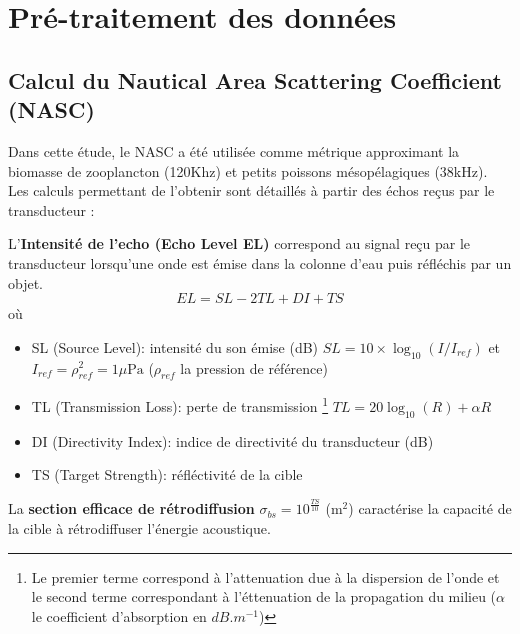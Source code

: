 \documentclass[11pt,a4paper,oneside]{report}
\begin{document}
	\section{Pré-traitement des données}
	\subsection{Calcul du Nautical Area Scattering Coefficient (NASC) \cite{IRD_MATECHO_User_Manual}}
	\label{section:compute_nasc}
	Dans cette étude, le NASC a été utilisée comme métrique approximant la biomasse de zooplancton (120Khz) et petits poissons mésopélagiques (38kHz). Les calculs permettant de l'obtenir sont détaillés à partir des échos reçus par le transducteur : 
	
	\vspace{0.5cm}
	
	L'\textbf{Intensité de l'echo (Echo Level EL) }correspond au signal reçu par le transducteur lorsqu'une onde est émise dans la colonne d'eau puis réfléchis par un objet.
	\begin{equation}
		EL = SL - 2TL + DI + TS
	\end{equation}	
	où 
	\begin{itemize}
		\item SL (Source Level): intensité du son émise (dB) $SL = 10 \times \log_{10}(I/I_{ref}) $ et $I_{ref} = \rho_{ref}^{2} = 1 \mu \text{Pa}$ ($\rho_{ref}$ la pression de référence)
		\item TL (Transmission Loss): perte de transmission  \footnote{Le premier terme correspond à l'attenuation due à la dispersion de l'onde et le second terme correspondant à l'éttenuation de la propagation du milieu ($\alpha$ le coefficient d'absorption en $dB.m^{-1}$)} $TL = 20 \log_{10} (R) + \alpha R$
		\item DI (Directivity Index): indice de directivité du transducteur (dB)
		\item TS (Target Strength): réfléctivité de la cible 
	\end{itemize}
	
	\vspace{0.5cm}
	
	La \textbf{section efficace de rétrodiffusion} \(\sigma_{bs} = 10^{\frac{TS}{10}}\)  (\(\mathrm{m^2}\)) caractérise la capacité de la cible à rétrodiffuser l'énergie acoustique. 
	
\end{document}
